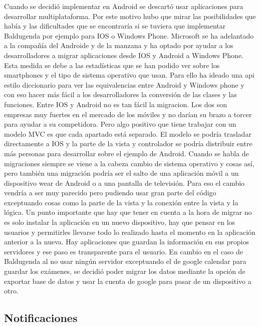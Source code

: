 Cuando se decidió implementar en Android se descartó usar aplicaciones para desarrollar multiplataforma.
Por este motivo hubo que mirar las posibilidades que había y las dificultades que se encontraría si se tuviera que implementar Baldugenda por ejemplo para IOS o Windows Phone.
Microsoft se ha adelantado a la compañía del Androide y de la manzana y ha optado por ayudar a los desarrolladores a migrar aplicaciones desde IOS y Android a Windows Phone.
Esta medida se debe a las estadísticas que se han podido ver sobre los smartphones y el tipo de sistema operativo que usan.
Para ello ha ideado una api estilo diccionario para ver las equivalencias entre Android y Windows phone y con eso hacer más fácil a los desarrolladores la conversión de las clases y las funciones.
Entre IOS y Android no es tan fácil la migracion. Los dos son empresas muy fuertes en el mercado de los móviles y no darían su brazo a torcer para ayudar a su competidora.
Pero algo positivo que tiene trabajar con un modelo MVC es que cada apartado está separado.
El modelo se podría trasladar directamente a IOS y la parte de la vista y controlador se podría distribuir entre más personas para desarrollar sobre el ejemplo de Android.
Cuando se habla de migraciones siempre se viene a la cabeza cambio de sistema operativo y cosas así, pero también una migración podría ser el salto de una aplicación móvil a un dispositivo wear de Android o a una pantalla de televisión. Para eso el cambio vendría a ser muy parecido pero pudiendo usar gran parte del código exceptuando cosas como la parte de la vista y la conexión entre la vista y la lógica.
Un punto importante que hay que tener en cuenta a la hora de migrar no es solo instalar la aplicación en un nuevo dispositivo, hay que pensar en los usuarios y permitirles llevarse todo lo realizado hasta el momento en la aplicación anterior a la nueva.
Hay aplicaciones que guardan la información en sus propios servidores y ese paso es transparente para el usuario.
En cambio en el caso de Baldugenda al no usar ningún servidor exceptuando el de google calendar para guardar los exámenes, se decidió poder migrar los datos mediante la opción de exportar base de datos y usar la cuenta de google para pasar de un dispositivo a otro.

\subsection{Notificaciones}
\label{subsecc:Notificaciones}

